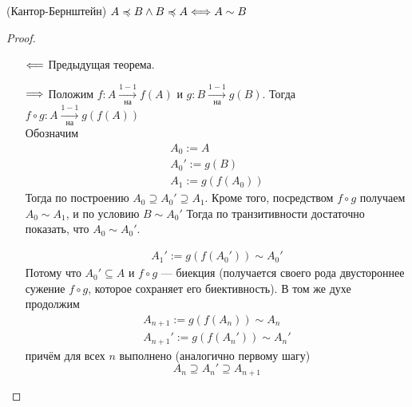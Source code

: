 \begin{theorem}(Кантор-Бернштейн)
    $A \preccurlyeq B \wedge B \preccurlyeq A \Longleftrightarrow A \sim B$
\end{theorem}
\begin{proof}
    \enewline
    \begin{itemize}
        \item[$\Longleftarrow$] Предыдущая теорема.
        \item[$\Longrightarrow$] Положим $f \colon A \xrightarrow[\text{на}]{1-1} f(A)$ и
        $g \colon B \xrightarrow[\text{на}]{1-1} g(B)$.
        Тогда $f \circ g \colon A \xrightarrow[\text{на}]{1-1} g(f(A))$ \\
        Обозначим
        \begin{gather*}
            A_0 := A \\
            A_0' := g(B) \\
            A_1 := g(f(A_0))
        \end{gather*}
        Тогда по построению $A_0 \supseteq A_0' \supseteq A_1$. Кроме того,
        посредством $f \circ g$ получаем $A_0 \sim A_1$, и по условию $B \sim A_0'$
        Тогда по транзитивности достаточно показать, что $A_0 \sim A_0'$.

        \begin{gather*}
            A_1' := g(f(A_0')) \sim A_0'
        \end{gather*}
        Потому что $A_0' \subseteq A$ и $f \circ g$ --- биекция (получается своего рода двустороннее сужение $f \circ g$, которое сохраняет его биективность). В том же духе продолжим
        \begin{gather*}
            A_{n+1} := g(f(A_n)) \sim A_n \\
            A_{n+1}' := g(f(A_n')) \sim A_n'
        \end{gather*}
        причём для всех $n$ выполнено (аналогично первому шагу)
\[
        A_n \supseteq A_n' \supseteq A_{n+1}
\]


\end{itemize}
\end{proof}
